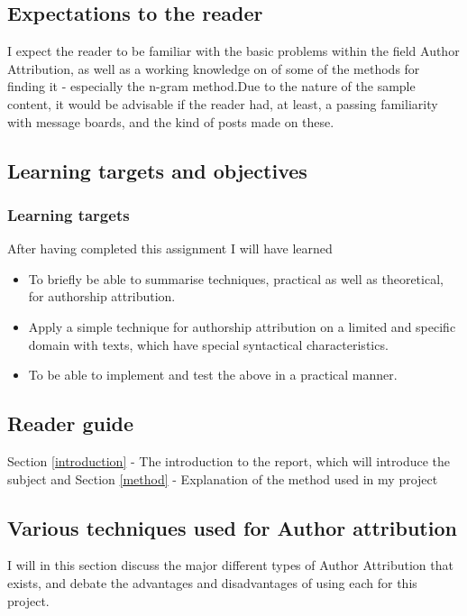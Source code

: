 \subsection{Expectations to the reader}
\label{expectations}
I expect the reader to be familiar with the basic problems within the field Author Attribution, as well as a working knowledge on of some of the methods for finding it - especially the n-gram method.Due to the nature of the sample content, it would be advisable if the reader had, at least, a passing familiarity with message boards, and the kind of posts made on these.

\subsection{Learning targets and objectives}
\label{lerning}
\subsubsection{Learning targets}
After having completed this assignment I will have learned 
\begin{itemize}
\item To briefly be able to summarise techniques, practical as well as theoretical, for authorship attribution.
\item Apply a simple technique for authorship attribution on a limited and specific domain with texts, which have special syntactical characteristics.
\item To be able to implement and test the above in a practical manner.
\end{itemize}

\subsection{Reader guide}
Section \ref{introduction} - The introduction to the report, which will introduce the subject and 
Section \ref{method} - Explanation of the method used in my project 

\subsection{Various techniques used for Author attribution}
\label{techniques}
I will in this section discuss the major different types of Author Attribution that exists, and debate the advantages and disadvantages of using each for this project.

